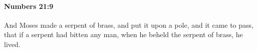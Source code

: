 
		\paragraph{Numbers 21:9} %
			\label{NUMBERS-21-9}

			And Moses made a serpent of brass, and put it upon a pole, and it came to pass, that if a serpent had bitten any man, when he beheld the serpent of brass, he lived.


